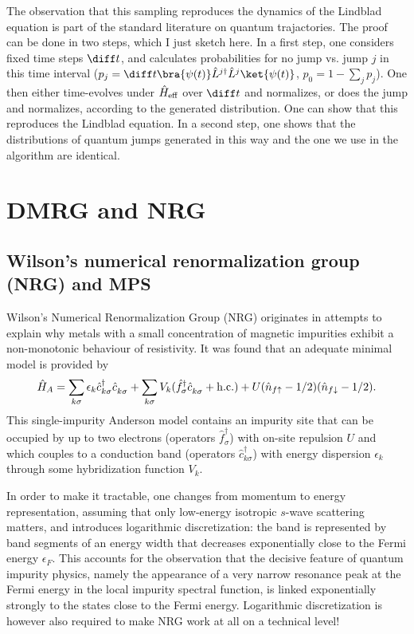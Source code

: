 The observation that this sampling reproduces the dynamics of the Lindblad equation is part of the standard literature on quantum trajactories. The proof can be done in two steps, which I just sketch here. In a first step, one considers fixed time steps $\diff t$, and calculates probabilities for no jump vs. jump $j$ in this time interval ($p_j = \diff t \bra{\psi(t)} \hat{L}^{j\dagger} \hat{L}^j \ket{\psi(t)}$, $p_0 = 1 - \sum_j p_j$). One then either time-evolves under $\hat{H}_{{\rm eff}}$ over $\diff t$ and normalizes, or does the jump and normalizes, according to the generated distribution. One can show that this reproduces the Lindblad equation. In a second step, one shows that the distributions of quantum jumps generated in this way and the one we use in the algorithm are identical.

\section{DMRG and NRG}
\subsection{Wilson's numerical renormalization group (NRG) and MPS}
Wilson's Numerical Renormalization Group (NRG) \cite{Wilson75,Bulla08,Krishnamurthy80} originates in attempts to explain why metals with a small concentration of magnetic impurities exhibit a non-monotonic behaviour of resistivity.
It was found that an adequate minimal model is provided by 
\begin{equation}
\hat{H}_A = \sum_{k\sigma} \epsilon_k \hat{c}^\dagger_{k\sigma} \hat{c}^{\phantom\dagger}_{k\sigma} + \sum_{k\sigma} V_k (\hat{f}^\dagger_\sigma \hat{c}^{\phantom\dagger}_{k\sigma} + {\rm h.c.}) + U (\hat{n}_{f\uparrow}-1/2) (\hat{n}_{f\downarrow}-1/2).
\end{equation}
This single-impurity Anderson model contains an impurity site that can be occupied by up to two electrons (operators $\hat{f}^\dagger_\sigma$) with on-site repulsion $U$ and which couples to a conduction band (operators $\hat{c}^\dagger_{k\sigma}$) with energy dispersion $\epsilon_k$ through some hybridization function $V_k$.

In order to make it tractable, one changes from momentum to energy representation, assuming that only low-energy isotropic $s$-wave scattering matters, and introduces logarithmic discretization: the band is represented by band segments of an energy width that decreases exponentially close to the Fermi energy $\epsilon_F$. This accounts for the observation that the decisive feature of quantum impurity physics, namely the appearance of a very narrow resonance peak at the Fermi energy in the local impurity spectral function, is linked exponentially strongly to the states close to the Fermi energy. Logarithmic discretization is however also required to make NRG work at all on a technical level!

